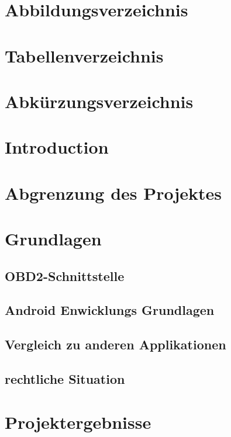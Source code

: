 \documentclass[4paper,10pt]{article}
\begin{document}
\tableofcontents
\newpage

\section{Abbildungsverzeichnis}
\listoffigures
\newpage

\section{Tabellenverzeichnis}
\listoftables
\newpage

\section{Abkürzungsverzeichnis}
\newpage





\setcounter{section}{0} 
\renewcommand{\thesection}{\arabic{section}}


\section{Introduction}
\newpage

\section{Abgrenzung des Projektes}
\newpage

\section{Grundlagen}
\subsection{OBD2-Schnittstelle}
\subsection{Android Enwicklungs Grundlagen}
\subsection{Vergleich zu anderen Applikationen}
\subsection{rechtliche Situation}
\newpage


\section{Projektergebnisse}
\newpage
\end{document}
